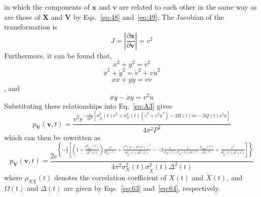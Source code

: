 \documentclass{article}
\begin{document}
in which the components of $\mathbf{x}$ and $\mathbf{v}$ are related to each
other in the same way as are those of $\mathbf{X}$ and $\mathbf{V}$ by
Eqs.~\eqref{eq:48} and~\eqref{eq:49}. The Jacobian of the transformation is
\begin{equation}
  J = \left| \frac{\partial \mathbf{x}}{\partial \mathbf{v}} \right| = v^2
  \label{eq:A4}
\end{equation}
Furthermore, it can be found that,
\begin{equation}
  x^2 + y^2 = v^2
\end{equation}
\begin{equation}
  \dot{x}^2 + \dot{y}^2 = \dot{v}^2 + v \dot{u}^2
\end{equation}
\begin{equation}
  x \dot{x} + y \dot{y} = v \dot{v}
\end{equation}
, and
\begin{equation}
  x \dot{y} - \dot{x} y = v^2  \dot{u}
\end{equation}
Substituting these relationships into Eq.~\eqref{eq:A3} gives
\begin{equation}
  p_{\mathbf{V}} (\mathbf{v}, t) = \frac{v^2 e^{- \frac{1}{2 P^2} 
  [\sigma_{\dot{X}}^2 (t) v^2 + \sigma_X^2 (t) (\dot{v}^2 + v^2  \dot{u}^2) -
  2 R (t) v \dot{v} - 2 Q (t) v^2  \dot{u}]}}{4 \pi^2 P^2}  \label{eq:A5}
\end{equation}
which can then be rewritten as
\begin{equation}
  p_{\mathbf{V}} (\mathbf{v}, t) = \frac{2 e^{\left\{ - \frac{1}{2}  \left[
  \left( 1 + \frac{\rho_{X \dot{X}}^2 (t)}{\Delta^2 (t)} \right) 
  \frac{v^2}{\sigma_X^2 (t)} + \frac{v^2 (\dot{u} - \Omega
  (t))^2}{\sigma_{\dot{X}}^2 (t) \Delta^2 (t)} - \right. \right. \left. \left.
  - 2 \frac{v}{\sigma_X (t)}  \frac{\dot{v}}{\sigma_{\dot{X}} (t) \Delta (t)} 
  \frac{\rho_{X \dot{X}} (t)}{\Delta (t)} +
  \frac{\dot{v}^2}{\sigma_{\dot{X}}^2 (t) \Delta^2 (t)} \right] \right\}}}{4
  \pi^2 \sigma_X^2 (t) \sigma_{\dot{X}}^2 (t) \Delta^2 (t)}
\end{equation}
where $\rho_{X \dot{X}} (t)$ denotes the correlation coefficient of $X (t)$
and $\dot{X} (t)$, and $\Omega (t)$ and $\Delta (t)$ arc given by
Eqs.~\eqref{eq:63} and~\eqref{eq:64}, respectively.
\end{document}
